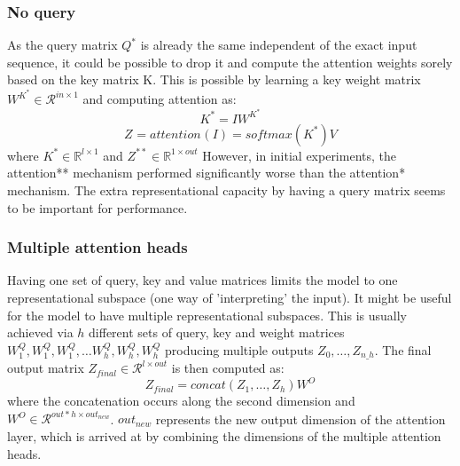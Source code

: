 \subsubsection{No query} \label{subsubsec:noquery}
As the query matrix ${Q}^*$ is already the same independent of the exact input sequence, it could be possible to drop it and compute the attention weights sorely based on the key matrix K.
This is possible by learning a key weight matrix $W^{K^*} \in \mathcal{R}^{in \times 1}$ and computing attention as:
$$K^* = IW^{K^*}$$
$$Z^{} = {attention}^{}(I) = softmax(K^*)V$$
where $K^* \in \mathbb{R}^{l \times 1}$ and $Z^{**} \in \mathbb{R}^{1 \times out}$
However, in initial experiments, the attention** mechanism performed significantly worse than the attention* mechanism. The extra representational capacity by having a query matrix seems to be important for performance.
\subsubsection{Multiple attention heads} \label{subsubsec:heads}
Having one set of query, key and value matrices limits the model to one representational subspace (one way of 'interpreting' the input). It might be useful for the model to have multiple representational subspaces. This is usually achieved via $h$ different sets of query, key and weight matrices $W^Q_1, W^Q_1, W^Q_1, \dots W^Q_{h}, W^Q_{h},W^Q_{h}$ producing multiple outputs $Z_0, \dots, Z_{n\_h}$.
The final output matrix $Z_{final} \in \mathcal{R}^{l \times out}$ is then computed as:
$$Z_{final} = concat(Z_1, \dots, Z_{h}) W^O$$
where the concatenation occurs along the second dimension and $W^O \in \mathcal{R}^{out * h \times out_{new}}$. $out_{new}$ represents the new output dimension of the attention layer, which is arrived at by combining the dimensions of the multiple attention heads.

